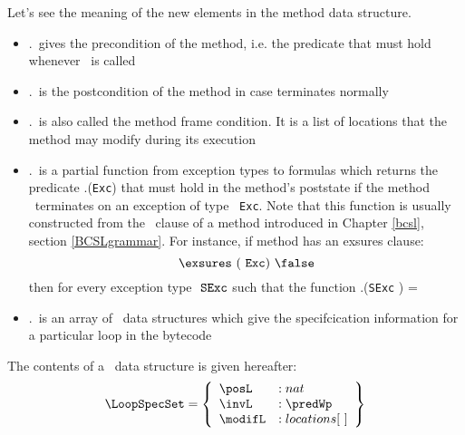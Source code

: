 Let's see the meaning of the new elements in the method data structure.
\begin{itemize}
     \item \methodd.\pre \ gives the precondition of the method, i.e. the predicate that must hold
           whenever \methodd \  is called
     \item \methodd.\normalPost \ is the postcondition of the method in case \methodd terminates normally  
     
     \item \methodd.\modif \ is also called the method frame condition. It is a list of locations that the method
            may modify during its execution    
     
     \item \methodd.\excPostSpec \ is a partial function from exception types to formulas which returns the predicate
           \methodd.\excPostSpec(\texttt{Exc})  that must hold in the method's poststate 
	   if the method \methodd \ terminates on an exception of type \mbox{ \rm \texttt{Exc}}. 
	   Note that this function is usually constructed from the \exsures \ clause of a method introduced in  Chapter \ref{bcsl},
	   section \ref{BCSLgrammar}. For instance, if method \methodd has an exsures clause:
	   $$ \exsures \  ( \mbox{ \rm \texttt{Exc}}) \ \false$$
	   then for every exception type $\mbox{ \rm \texttt{SExc}} $ such that 
	   the function \methodd.\excPostSpec(\texttt{SExc} ) = \false
     \item \methodd.\loopSpecTable \ is an array of \LoopSpecSet \ data structures which give the specifcication information 
           for a particular loop in the bytecode         
\end{itemize}

 
The contents of a \LoopSpecSet \ data structure is given hereafter:
$$ \begin{array}{l}
      \LoopSpecSet = \left\{\begin{array}{ll}  
                                       \posL   & : nat \\
                                       \invL   & : \predWp \\                 
	                               \modifL   & : locations\lbrack \ \rbrack  
                            \end{array}  \right\} 
     \end{array} $$ 


